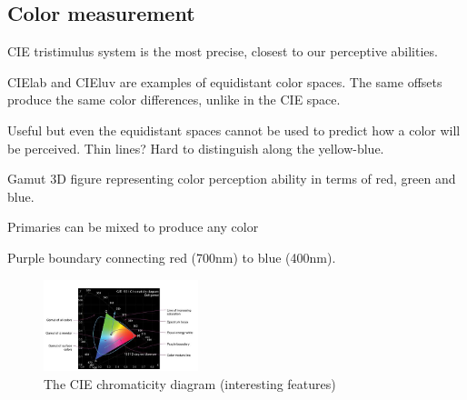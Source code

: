 \begin{mdframed}\begin{multicols}{2}
\subsection{Color measurement}
\begin{compactdesc}
    \item[CIE tristimulus system] is the most precise, closest to our perceptive
        abilities.
    \item[CIElab and CIEluv] are examples of equidistant color spaces.
        The same offsets produce the same color differences, unlike in the
        CIE space.
    \item[Useful] but even the equidistant spaces cannot be used to predict
        how a color will be perceived. Thin lines? Hard to distinguish
        along the yellow-blue.

    \item[Gamut] 3D figure representing color perception ability in terms
        of red, green and blue.
    \item[Primaries] can be mixed to produce any color
    \item[Purple boundary] connecting red (700nm) to blue (400nm).
\end{compactdesc}
    \begin{figure}[H]
        \centering
        \includegraphics[width=0.4\textwidth]{cie_chromaticity.png}
        \caption{The CIE chromaticity diagram (interesting features)}
    \end{figure}


\end{multicols}\end{mdframed}


